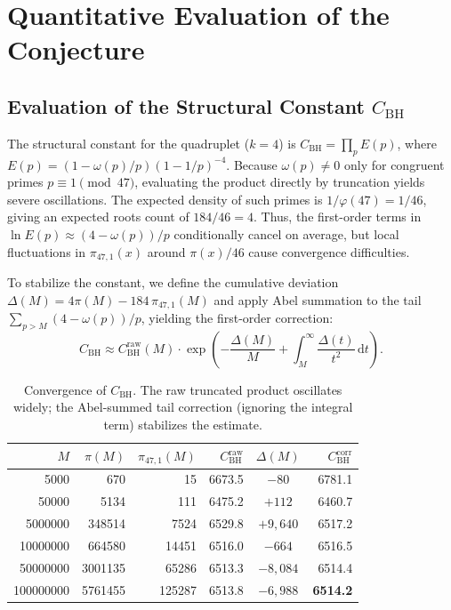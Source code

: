 \documentclass[11pt, a4paper]{article}
\begin{document}
\section{Quantitative Evaluation of the Conjecture}\label{sec:bh}

\subsection{Evaluation of the Structural Constant $C_{\mathrm{BH}}$}\label{sec:cbh}

The structural constant for the quadruplet ($k=4$) is $C_{\mathrm{BH}} = \prod_{p} E(p)$, where $E(p) = (1 - \omega(p)/p)(1 - 1/p)^{-4}$. Because $\omega(p) \neq 0$ only for congruent primes $p \equiv 1 \pmod{47}$, evaluating the product directly by truncation yields severe oscillations. The expected density of such primes is $1/\varphi(47) = 1/46$, giving an expected roots count of $184/46 = 4$. Thus, the first-order terms in $\ln E(p) \approx (4-\omega(p))/p$ conditionally cancel on average, but local fluctuations in $\pi_{47,1}(x)$ around $\pi(x)/46$ cause convergence difficulties.

To stabilize the constant, we define the cumulative deviation $\Delta(M) = 4\pi(M) - 184\,\pi_{47,1}(M)$ and apply Abel summation to the tail $\sum_{p > M} (4 - \omega(p))/p$, yielding the first-order correction:
\begin{equation}\label{eq:tail}
C_{\mathrm{BH}} \approx C_{\mathrm{BH}}^{\mathrm{raw}}(M) \cdot \exp\!\left(-\frac{\Delta(M)}{M} + \int_{M}^{\infty} \frac{\Delta(t)}{t^{2}}\,\mathrm{d}t\right).
\end{equation}

\begin{table}[H]
\centering
\caption{Convergence of $C_{\mathrm{BH}}$. The raw truncated product oscillates widely; the Abel-summed tail correction (ignoring the integral term) stabilizes the estimate.}
\label{tab:cbh}
\small
\begin{tabular}{rrrrcr}
\toprule
$M$ & $\pi(M)$ & $\pi_{47,1}(M)$ & $C_{\mathrm{BH}}^{\mathrm{raw}}$ & $\Delta(M)$ & $C_{\mathrm{BH}}^{\mathrm{corr}}$ \\
\midrule
\num{5000}        & \num{670}       & 15      & 6673.5 & $-80$      & 6781.1 \\
\num{50000}       & \num{5134}      & 111     & 6475.2 & $+112$     & 6460.7 \\
\num{5000000}     & \num{348514}    & \num{7524}   & 6529.8 & $+9{,}640$   & 6517.2 \\
\num{10000000}    & \num{664580}    & \num{14451}  & 6516.0 & $-664$     & 6516.5 \\
\num{50000000}    & \num{3001135}   & \num{65286}  & 6513.3 & $-8{,}084$   & 6514.4 \\
\num{100000000}   & \num{5761455}   & \num{125287} & 6513.8 & $-6{,}988$   & \textbf{6514.2} \\
\bottomrule
\end{tabular}
\end{table}
\end{document}
